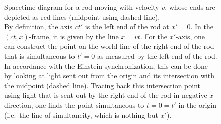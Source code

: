 \begin{figure}
	\centering



		\caption[Spacetime diagram for a moving rod]{Spacetime diagram for a rod moving with velocity $v$, whose ends are depicted as red lines (midpoint using dashed line).\\
		By definition, the axis $ct'$ is the left end of the rod at $x' = 0$. In the $(ct, x)$-frame, it is given by the line $x = vt$. For the $x'$-axis, one can construct the point on the world line of the right end of the rod that is simultaneous to $t' = 0$ as measured by the left end of the rod. In accordance with the Einstein synchronization, this can be done by looking at light sent out from the origin and its intersection with the midpoint (dashed line). Tracing back this intersection point using light that is sent out by the right end of the rod in negative $x$-direction, one finds the point simultaneous to $t = 0 = t'$ in the origin (i.e.~the line of simultaneity, which is nothing but $x'$).}
		\label{fig:moving_rod_diagram}
\end{figure}





